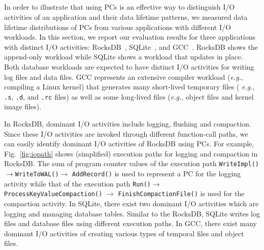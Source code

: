 \subsection{}
\vspace{-5pt}
In order to illustrate that using PCs is an effective way to distinguish I/O
activities of an application and their data lifetime patterns, we measured data
lifetime distributions of PCs from various applications with different I/O
workloads.  In this section, we report our evaluation results for three
applications with distinct I/O activities: RocksDB~\cite{RocksDB},
SQLite~\cite{SQLite}, and GCC~\cite{GCC}.  RocksDB shows the append-only
workload while SQLite shows a workload that updates in place.  Both database
workloads are expected to have distinct I/O activities for writing log files
and data files.  GCC represents an extensive compiler workload ({\it e.g.},
compiling a Linux kernel) that generates many short-lived temporary files ({\it
e.g.}, \texttt{.s}, \texttt{.d}, and \texttt{.rc} files) as well as some
long-lived files ({\it e.g.}, object files and kernel image files).

In RocksDB, dominant I/O activities include logging, flushing and compaction.
Since these I/O activities are invoked through different function-call paths,
we can easily identify dominant I/O activities of RocksDB using PCs.  For
example, Fig.~\ref{fig:iopath} shows (simplified) execution paths for logging
and compaction in RocksDB.  The sum of program counter values of the execution
path \texttt{WriteImpl()}$\rightarrow$\texttt{WriteToWAL()}$\rightarrow$
\texttt{AddRecord()} is used to represent a PC for the logging activity while
that of the execution path \texttt{Run()}$\rightarrow$
\texttt{ProcessKeyValueCompaction()} $\rightarrow$
\texttt{FinishCompactionFile()} is used for the compaction activity.
In SQLite, there exist two dominant I/O activities which are logging and
managing database tables.  Similar to the RocksDB, SQLite writes log files and
database files using different execution paths.  In GCC, there exist many
dominant I/O activities of creating various types of temporal files and object
files.


